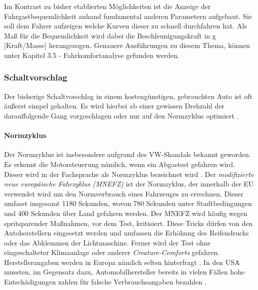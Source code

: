 Im Kontrast zu bisher etablierten Möglichkeiten ist die Anzeige der Fahrgastbequemlichkeit anhand fundamental anderen Parametern aufgebaut. Sie soll dem Fahrer aufzeigen welche Kurven dieser zu schnell durchfahren hat. Als Maß für die Bequemlichkeit wird dabei die Beschleunigungskraft in g [Kraft/Masse] herangezogen. Genauere Ausführungen zu diesem Thema, können unter Kapitel 3.5 - Fahrkomfortanalyse gefunden werden.

\subsubsection{Schaltvorschlag}
Der bisherige Schaltvorschlag in einem kostengünstigen, gebrauchten Auto ist oft äußerst simpel gehalten. Es wird hierbei ab einer gewissen Drehzahl der darauffolgende Gang vorgeschlagen oder nur auf den Normzyklus optimiert \cite{SIMR.CH1-Fahrstil-Analyse.Schaltempfehlung}.
\paragraph{Normzyklus}
Der Normzyklus ist insbesondere aufgrund des VW-Skandals bekannt geworden. Es erkennt die Motorsteuerung nämlich, wenn ein Abgastest gefahren wird. Dieser wird in der Fachsprache als Normzyklus bezeichnet wird \cite{SIMR.CH1-fahrstil-analyse.Normzyklus}. Der \textit{modifizierte neue europäische Fahrzyklus (MNEFZ)} ist der Normzyklus, der innerhalb der EU verwendet wird um den Normverbrauch eines Fahrzeuges zu errechnen. Dieser umfasst insgesamt 1180 Sekunden, wovon 780 Sekunden unter Stadtbedingungen und 400 Sekunden über Land gefahren werden. Der MNEFZ wird häufig wegen spritsparender Maßnahmen, vor dem Test, kritisiert. Diese Tricks dürfen von den Autoherstellern eingesetzt werden und umfassen die Erhöhung des Reifendrucks oder das Abklemmen der Lichtmaschine. Ferner wird der Test ohne eingeschalteter Klimaanlage oder anderer \textit{Creature-Comforts} gefahren. Herstellerangaben werden in Europa nämlich selten hinterfragt \cite{SIMR.CH1-fahrstil-analyse.MNEFZ}. In den USA mussten, im Gegensatz dazu, Automobilhersteller bereits in vielen Fällen hohe Entschädigungen zahlen für falsche Verbrauchsangaben bezahlen \cite{SIMR.CH1-fahrstil-analyse.falscherVerbrauchUS}.

